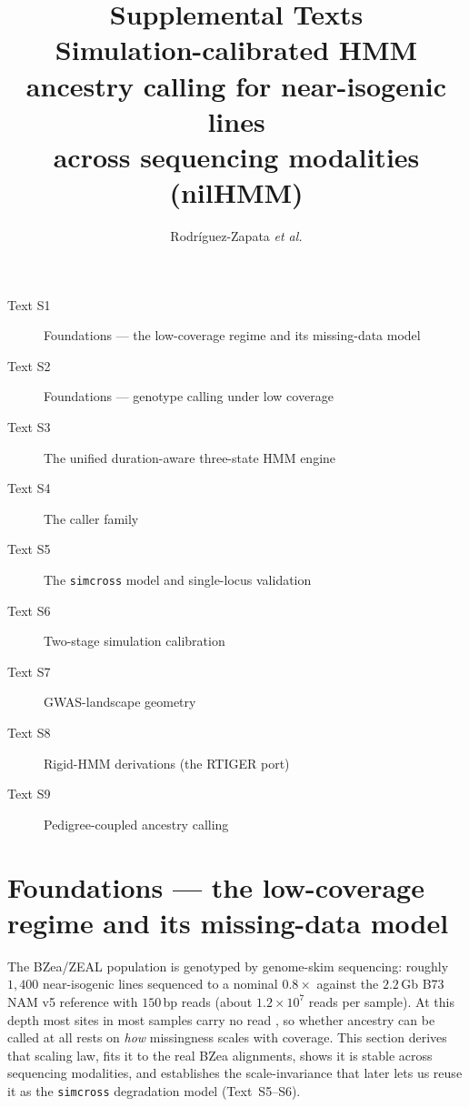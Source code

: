 \documentclass[11pt]{article}
\title{Supplemental Texts\\[2pt]
\large Simulation-calibrated HMM ancestry calling for near-isogenic lines\\
across sequencing modalities (nilHMM)}
\author{Rodr\'iguez-Zapata \textit{et al.}}
\date{}
\newcommand{\code}[1]{\texttt{#1}}
\begin{document}
\maketitle

\medskip
\begin{description}
\item[Text S1] Foundations --- the low-coverage regime and its missing-data model
\item[Text S2] Foundations --- genotype calling under low coverage
\item[Text S3] The unified duration-aware three-state HMM engine
\item[Text S4] The caller family
\item[Text S5] The \code{simcross} model and single-locus validation
\item[Text S6] Two-stage simulation calibration
\item[Text S7] GWAS-landscape geometry
\item[Text S8] Rigid-HMM derivations (the RTIGER port)
\item[Text S9] Pedigree-coupled ancestry calling
\end{description}
\clearpage

\section{Foundations --- the low-coverage regime and its missing-data model}
\label{sec:foundations-missing}

The BZea/ZEAL population is genotyped by genome-skim sequencing: roughly
$1{,}400$ near-isogenic lines sequenced to a nominal $0.8\times$ against the
$2.2$\,Gb B73 NAM v5 reference with $150$\,bp reads (about $1.2\times10^{7}$
reads per sample). At this depth most sites in most samples carry no read
\citep{elshire_2011,nielsen_2011}, so whether ancestry can be called at all rests
on \emph{how} missingness scales with coverage. This section derives that scaling law, fits it to the real BZea
alignments, shows it is stable across sequencing modalities, and establishes the
scale-invariance that later lets us reuse it as the \texttt{simcross} degradation
model (Text~S5--S6).
\end{document}
